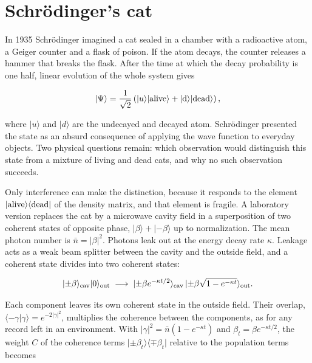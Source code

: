 \documentclass[11pt,oneside]{book}
\newenvironment{centeredalign}{\[\begin{gathered}[c]}{\end{gathered}\]}
\newcommand{\ket}[1]{\lvert #1\rangle}
\newcommand{\bra}[1]{\langle #1\rvert}
\begin{document}
\clearpage

\section{Schrödinger's cat}

\label{topic:schr-dinger-s-cat}

In 1935 Schrödinger imagined a cat sealed in a chamber with a radioactive atom, a Geiger counter and a flask of poison. If the atom decays, the counter releases a hammer that breaks the flask. After the time at which the decay probability is one half, linear evolution of the whole system gives

\begin{centeredalign}
\ket\Psi=\frac{1}{\sqrt2}\left(\ket{u}\ket{\rm alive}+\ket{d}\ket{\rm dead}\right),
\end{centeredalign}

where \(\ket u\) and \(\ket d\) are the undecayed and decayed atom. Schrödinger presented the state as an absurd consequence of applying the wave function to everyday objects. Two physical questions remain: which observation would distinguish this state from a mixture of living and dead cats, and why no such observation succeeds.

Only interference can make the distinction, because it responds to the element \(\ket{\rm alive}\bra{\rm dead}\) of the density matrix, and that element is fragile. A laboratory version replaces the cat by a microwave cavity field in a superposition of two coherent states of opposite phase, \(\ket\beta+\ket{-\beta}\) up to normalization. The mean photon number is \(\bar n=|\beta|^2\). Photons leak out at the energy decay rate \(\kappa\). Leakage acts as a weak beam splitter between the cavity and the outside field, and a coherent state divides into two coherent states:

\begin{centeredalign}
\ket{\pm\beta}_{\rm cav}\ket0_{\rm out}\;\longrightarrow\;
\ket{\pm\beta e^{-\kappa t/2}}_{\rm cav}\,\ket{\pm\beta\sqrt{1-e^{-\kappa t}}}_{\rm out}.
\end{centeredalign}

Each component leaves its own coherent state in the outside field. Their overlap, \(\langle-\gamma|\gamma\rangle=e^{-2|\gamma|^2}\), multiplies the coherence between the components, as for any record left in an environment. With \(|\gamma|^2=\bar n(1-e^{-\kappa t})\) and \(\beta_t=\beta e^{-\kappa t/2}\), the weight \(C\) of the coherence terms \(\ket{\pm\beta_t}\bra{\mp\beta_t}\) relative to the population terms becomes
\end{document}
